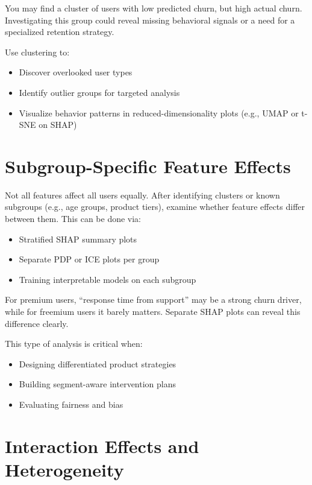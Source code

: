 \documentclass[12pt,openany, draft]{book}
\begin{document}
\begin{examplebox}
You may find a cluster of users with low predicted churn, but high actual churn. Investigating this group could reveal missing behavioral signals or a need for a specialized retention strategy.
\end{examplebox}

Use clustering to:
\begin{itemize}
  \item Discover overlooked user types
  \item Identify outlier groups for targeted analysis
  \item Visualize behavior patterns in reduced-dimensionality plots (e.g., UMAP or t-SNE on SHAP)
\end{itemize}



\section{Subgroup-Specific Feature Effects}

Not all features affect all users equally. After identifying clusters or known subgroups (e.g., age groups, product tiers), examine whether feature effects differ between them. This can be done via:
\begin{itemize}
  \item Stratified SHAP summary plots
  \item Separate PDP or ICE plots per group
  \item Training interpretable models on each subgroup
\end{itemize}

\begin{examplebox}
For premium users, ``response time from support'' may be a strong churn driver, while for freemium users it barely matters. Separate SHAP plots can reveal this difference clearly.
\end{examplebox}

This type of analysis is critical when:
\begin{itemize}
  \item Designing differentiated product strategies
  \item Building segment-aware intervention plans
  \item Evaluating fairness and bias
\end{itemize}

\section{Interaction Effects and Heterogeneity}
\end{document}
